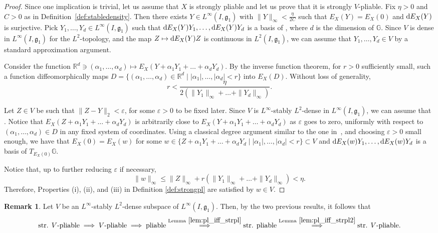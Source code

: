\documentclass[pdftex]{sigma}
\numberwithin{equation}{section}
\theoremstyle{definition}
\newtheorem{Remark}[Theorem]{Remark}
\begin{document}
\begin{proof}
Since one implication is trivial, let us assume that $X$ is strongly
pliable and let us prove that it is strongly $V$-pliable.
 Fix $\eta>0$ and $C>0$ as in Definition~\ref{def:stabledensity}.
 Then there exists $Y\in L^\infty(I,{\mathfrak g}_1)$
 with $\|Y\|_\infty<\frac{\eta}{2C}$ such that $E_X(Y)=E_X(0)$ and
 ${\rm d}E_X(Y)$ is surjective. Pick $Y_1,\dots,Y_d\in L^\infty(I,{\mathfrak g}_1)$ such that
${\rm d}E_X(Y)Y_1,\dots,{\rm d}E_X(Y)Y_d$ is a basis of , where $d$ is the dimension of $\mathbb{G}$.
 Since $V$ is dense in $L^\infty(I,{\mathfrak g}_1)$ for the $L^2$-topology,
 and the map
 $Z\mapsto {\rm d}E_X(Y)Z$ is continuous in $L^2(I,{\mathfrak g}_1)$, we can assume that $Y_1,\dots,Y_d\in V$
 by a standard approximation argument.

Consider the function $\mathbb{R}^d\ni (\alpha_1,\dots,\alpha_d)\mapsto E_X(Y+\alpha_1 Y_1+\dots+\alpha_d Y_d)$.
 By the inverse function theorem, for $r>0$ sufficiently small,
 such a function diffeomorphically maps $D=\{(\alpha_1,\dots,\alpha_d)\in \mathbb{R}^d \mid |\alpha_1|,\dots,|\alpha_d|<r \}$ into $E_X(D)$.
 Without loss of generality, \[r<\frac{\eta}{2(\|Y_1\|_\infty+\dots+\|Y_d\|_\infty)}.\]

 Let $Z\in V$ be such that $\|Z-Y\|_2<\varepsilon$, for some $\varepsilon>0$ to be fixed later.
 Since $V$ is
 $L^\infty$-stably $L^2$-dense in $L^\infty(I,{\mathfrak g}_1)$, we can assume that .
 Notice that
 ${E_X(Z+\alpha_1 Y_1+\dots+\alpha_d Y_d)}$ is arbitrarily close to $E_X(Y+\alpha_1 Y_1+\dots+\alpha_d Y_d)$ as $\varepsilon$ goes to zero, uniformly with respect to $(\alpha_1,\dots,\alpha_d)\in D$
 in any fixed system of coordinates.
 Using a classical degree argument similar to the one in~\cite[Lemma~5.5]{SS18}, and choosing $\varepsilon>0$ small enough, we have that $E_X(0)=E_X(w)$ for some $w\in \{Z+\alpha_1 Y_1+\dots+\alpha_d Y_d\mid |\alpha_1|,\dots,|\alpha_d|<r\}\subset V$ and ${\rm d}E_X(w)Y_1,\dots,{\rm d}E_X(w)Y_d$ is a basis of $T_{E_X(0)}\mathbb{G}$.

 Notice that, up to further reducing $\varepsilon$ if necessary,
 \[
 \|w\|_\infty\le \|Z\|_\infty +r (\|Y_1\|_\infty+\dots+\|Y_d\|_\infty)< \eta.
 \]
 Therefore, Properties (i), (ii), and (iii) in Definition \ref{def:strongpl} are satisfied by $w\in V$.
\end{proof}

\begin{Remark}\label{rmk:Vdense}
 Let $V$ be
 an $L^\infty$-stably $L^2$-dense subspace of $ L^\infty(I,{\mathfrak g}_1)$.
 Then, by the two previous results, it follows that
 \begin{equation*}
 \text{str. $V$-pliable} \implies \text{$V$-pliable} \implies \text{pliable} \stackrel{\rm Lemma \ \ref{lem:pl_iff_strpl}}{\implies} \text{str. pliable} \stackrel{\rm Lemma \ \ref{lem:pl_iff_strpl2}}{\implies} \text{str. $V$-pliable}.
 \end{equation*}
\end{Remark}
\end{document}
